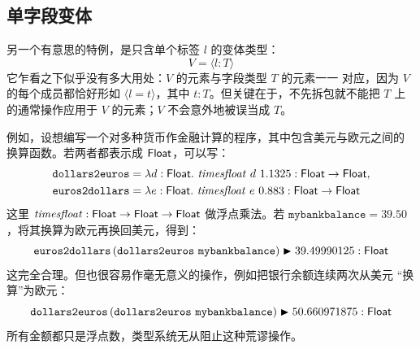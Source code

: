 \subsection*{单字段变体}

另一个有意思的特例，是只含单个标签 \(l\) 的变体类型：
\[
V=\langle l:T\rangle
\]
它乍看之下似乎没有多大用处：\(V\) 的元素与字段类型 \(T\) 的元素一一
对应，因为 \(V\) 的每个成员都恰好形如 \(\langle l=t\rangle\)，其中
\(t:T\)。但关键在于，不先拆包就不能把 \(T\) 上的通常操作应用于 \(V\)
的元素；\(V\) 不会意外地被误当成 \(T\)。

例如，设想编写一个对多种货币作金融计算的程序，其中包含美元与欧元之间的
换算函数。若两者都表示成 \(\mathsf{Float}\)，可以写：
\[
\begin{aligned}
\texttt{dollars2euros}
 &=\lambda d:\mathsf{Float}.\
   \mathit{timesfloat}\ d\ 1.1325
   :\mathsf{Float}\to\mathsf{Float},\\
\texttt{euros2dollars}
 &=\lambda e:\mathsf{Float}.\
   \mathit{timesfloat}\ e\ 0.883
   :\mathsf{Float}\to\mathsf{Float}
\end{aligned}
\]
这里 \(\mathit{timesfloat}:
\mathsf{Float}\to\mathsf{Float}\to\mathsf{Float}\) 做浮点乘法。若
\(\texttt{mybankbalance}=39.50\)，将其换算为欧元再换回美元，得到：
\[
\texttt{euros2dollars}\,
(\texttt{dollars2euros}\ \texttt{mybankbalance})
\blacktriangleright39.49990125:\mathsf{Float}
\]
这完全合理。但也很容易作毫无意义的操作，例如把银行余额连续两次从美元
“换算”为欧元：
\[
\texttt{dollars2euros}\,
(\texttt{dollars2euros}\ \texttt{mybankbalance})
\blacktriangleright50.660971875:\mathsf{Float}
\]
所有金额都只是浮点数，类型系统无从阻止这种荒谬操作。


